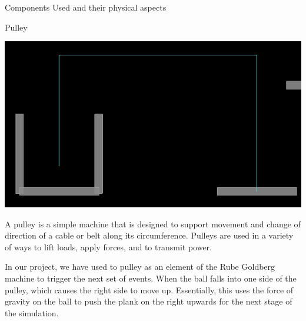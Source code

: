 \documentclass[a4paper,12pt]{article}
\begin{document}
\begin{section}{Components Used and their physical aspects}
\begin{subsection}{Pulley}
\begin{center}
\includegraphics[scale=.35]{./Images/Pulley.png}
\end{center}
A pulley is a simple machine that is designed to support movement and change of direction of a cable or belt along its circumference. Pulleys are used in a variety of ways to lift loads, apply forces, and to transmit power.

In our project, we have used to pulley as an element of the Rube Goldberg machine to trigger the next set of events. When the ball falls into one side of the pulley, which causes the right side to move up. Essentially, this uses the force of gravity on the ball to push the plank on the right upwards for the next stage of the simulation.
\end{subsection}


\end{section}
\end{document}
